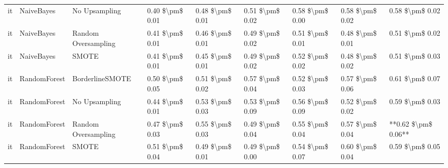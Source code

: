 \begin{tabular}{lllllllll}
      it &                      NaiveBayes &                 No Upsampling & 0.40 \$\textbackslash pm\$ 0.01 &           0.48 \$\textbackslash pm\$ 0.01 &       0.51 \$\textbackslash pm\$ 0.02 &        0.58 \$\textbackslash pm\$ 0.00 &                         0.58 \$\textbackslash pm\$ 0.02 &     0.58 \$\textbackslash pm\$ 0.02 \\
      it &                      NaiveBayes &           Random Oversampling & 0.41 \$\textbackslash pm\$ 0.01 &           0.46 \$\textbackslash pm\$ 0.01 &       0.49 \$\textbackslash pm\$ 0.02 &        0.51 \$\textbackslash pm\$ 0.01 &                         0.48 \$\textbackslash pm\$ 0.01 &     0.51 \$\textbackslash pm\$ 0.02 \\
      it &                      NaiveBayes &                         SMOTE & 0.41 \$\textbackslash pm\$ 0.01 &           0.45 \$\textbackslash pm\$ 0.01 &       0.49 \$\textbackslash pm\$ 0.02 &        0.52 \$\textbackslash pm\$ 0.02 &                         0.48 \$\textbackslash pm\$ 0.02 &     0.51 \$\textbackslash pm\$ 0.03 \\
      it &                    RandomForest &               BorderlineSMOTE & 0.50 \$\textbackslash pm\$ 0.05 &           0.51 \$\textbackslash pm\$ 0.02 &       0.57 \$\textbackslash pm\$ 0.04 &        0.52 \$\textbackslash pm\$ 0.03 &                         0.57 \$\textbackslash pm\$ 0.06 &     0.61 \$\textbackslash pm\$ 0.07 \\
      it &                    RandomForest &                 No Upsampling & 0.44 \$\textbackslash pm\$ 0.01 &           0.53 \$\textbackslash pm\$ 0.03 &       0.53 \$\textbackslash pm\$ 0.09 &        0.56 \$\textbackslash pm\$ 0.09 &                         0.52 \$\textbackslash pm\$ 0.02 &     0.59 \$\textbackslash pm\$ 0.03 \\
      it &                    RandomForest &           Random Oversampling & 0.47 \$\textbackslash pm\$ 0.03 &           0.55 \$\textbackslash pm\$ 0.03 &       0.49 \$\textbackslash pm\$ 0.04 &        0.55 \$\textbackslash pm\$ 0.04 &                         0.57 \$\textbackslash pm\$ 0.04 & **0.62 \$\textbackslash pm\$ 0.06** \\
      it &                    RandomForest &                         SMOTE & 0.51 \$\textbackslash pm\$ 0.04 &           0.49 \$\textbackslash pm\$ 0.01 &       0.49 \$\textbackslash pm\$ 0.00 &        0.54 \$\textbackslash pm\$ 0.07 &                         0.60 \$\textbackslash pm\$ 0.04 &     0.59 \$\textbackslash pm\$ 0.05 \\

\end{tabular}
